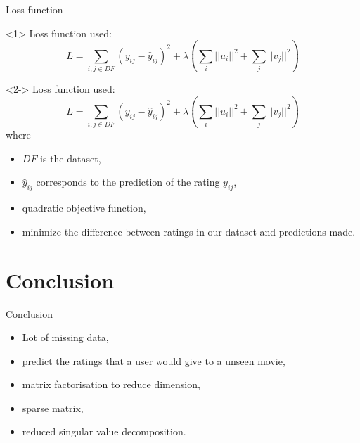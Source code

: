 \documentclass[unknownkeysallowed]{beamer}
\begin{document}
\begin{frame}{Loss function}
\begin{onlyenv}<1>
    Loss function used:
    $$L=\sum_{i,j \in DF} (y_{ij} - \hat{y}_{ij})^2 + \lambda\left(\sum_i || u_i ||^2 + \sum_j || v_j ||^2\right)$$
\end{onlyenv}
\begin{onlyenv}<2->
    Loss function used:
    $$L=\sum_{i,j \in DF} (y_{ij} - \hat{y}_{ij})^2 + \lambda\left(\sum_i || u_i ||^2 + \sum_j || v_j ||^2\right)$$
    where 
    \begin{itemize}
        \item $DF$ is the dataset, 
        \item $\hat{y}_{ij}$ corresponds to the prediction of the rating $y_{ij}$,
        \item quadratic objective function,
        \item minimize the difference between ratings in our dataset and predictions made.
    \end{itemize}
\end{onlyenv}
\end{frame}

\section{Conclusion}

\begin{frame}{Conclusion}
\begin{itemize}
    \item Lot of missing data, 
    \item predict the ratings that a user would give to a unseen movie,
    \item matrix factorisation to reduce dimension, 
    \item sparse matrix,
    \item reduced singular value decomposition.
\end{itemize}
\end{frame}
\end{document}
